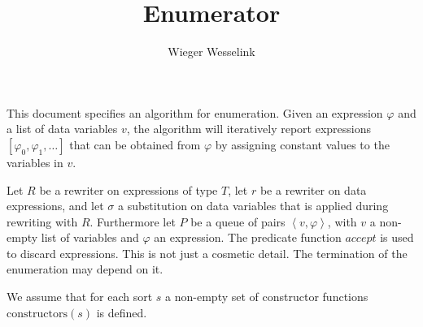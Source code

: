 \documentclass{article}
\begin{document}
\title{Enumerator}
\author{Wieger Wesselink}
\maketitle

This document specifies an algorithm for enumeration. Given an expression $\varphi$ and
a list of data variables $v$, the algorithm will iteratively report expressions
$[\varphi_0, \varphi_1, \ldots]$ that can be obtained from $\varphi$ by assigning
constant values to the variables in $v$.

Let $R$ be a rewriter on expressions of type $T$, let $r$ be a rewriter on
data expressions, and let $\sigma $ a substitution on data variables that is
applied during rewriting with $R$. Furthermore let $P$ be a queue of pairs
$\left\langle v,\varphi \right\rangle$, with $v$ a non-empty list of variables and
$\varphi$ an expression. The predicate function $accept$ is used to discard
expressions. This is not just a cosmetic detail. The termination of the
enumeration may depend on it.

We assume that for each sort $s$ a non-empty set of
constructor functions $\mathrm{constructors}(s)$ is defined.
\end{document}
